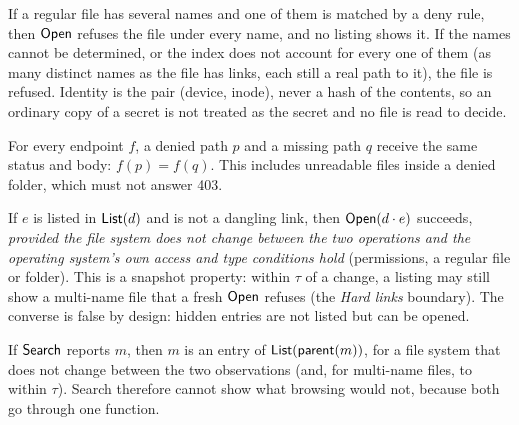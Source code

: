 \begin{law}
\label{law:linked}
If a regular file has several names and one of them is matched by a deny rule,
then $\mathsf{Open}$ refuses the file under every name, and no listing shows it.  If the
names cannot be determined, or the index does not account for every one of them
(as many distinct names as the file has links, each still a real path to it), the
file is refused.  Identity is the pair
(device, inode), never a hash of the contents, so an ordinary copy of a secret is
not treated as the secret and no file is read to decide.
\end{law}

\begin{law}
\label{law:indist}
For every endpoint $f$, a denied path $p$ and a missing path $q$ receive the
same status and body: $f(p)=f(q)$.  This includes unreadable files inside a
denied folder, which must not answer 403.
\end{law}

\begin{law}
\label{law:listed-open}
If $e$ is listed in $\mathsf{List}(d)$ and is not a dangling link, then $\mathsf{Open}(d\cdot e)$
succeeds, \emph{provided the file system does not change between the two
operations and the operating system's own access and type conditions hold}
(permissions, a regular file or folder).  This is a snapshot property: within
$\tau$ of a change, a listing may still show a multi-name file that a fresh
$\mathsf{Open}$ refuses (the \emph{Hard links} boundary).  The converse is false by
design: hidden entries are not listed but can be opened.
\end{law}

\begin{law}
\label{law:found-listed}
If $\mathsf{Search}$ reports $m$, then $m$ is an entry of $\mathsf{List}(\mathsf{parent}(m))$, for a
file system that does not change between the two observations (and, for
multi-name files, to within $\tau$).  Search therefore cannot show what browsing
would not, because both go through one function.
\end{law}

